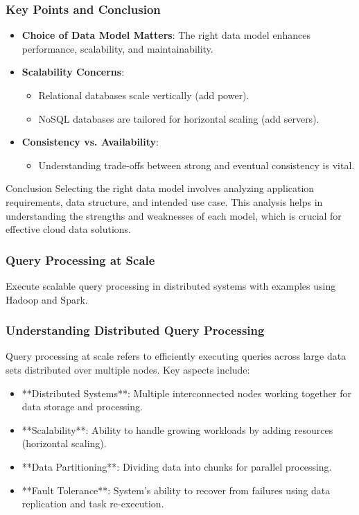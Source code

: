 \documentclass[aspectratio=169]{beamer}
\begin{document}
\begin{frame}[fragile]
    \frametitle{Key Points and Conclusion}
    
    \begin{itemize}
        \item \textbf{Choice of Data Model Matters}: The right data model enhances performance, scalability, and maintainability.
        \item \textbf{Scalability Concerns}: 
            \begin{itemize}
                \item Relational databases scale vertically (add power).
                \item NoSQL databases are tailored for horizontal scaling (add servers).
            \end{itemize}
        \item \textbf{Consistency vs. Availability}: 
            \begin{itemize}
                \item Understanding trade-offs between strong and eventual consistency is vital.
            \end{itemize}
    \end{itemize}
    
    \begin{block}{Conclusion}
        Selecting the right data model involves analyzing application requirements, data structure, and intended use case. 
        This analysis helps in understanding the strengths and weaknesses of each model, which is crucial for effective cloud data solutions.
    \end{block}
\end{frame}

\begin{frame}[fragile]
    \frametitle{Query Processing at Scale}
    Execute scalable query processing in distributed systems with examples using Hadoop and Spark.
\end{frame}

\begin{frame}[fragile]
    \frametitle{Understanding Distributed Query Processing}
    Query processing at scale refers to efficiently executing queries across large data sets distributed over multiple nodes. Key aspects include:
    \begin{itemize}
        \item **Distributed Systems**: Multiple interconnected nodes working together for data storage and processing.
        \item **Scalability**: Ability to handle growing workloads by adding resources (horizontal scaling).
        \item **Data Partitioning**: Dividing data into chunks for parallel processing.
        \item **Fault Tolerance**: System's ability to recover from failures using data replication and task re-execution.
    \end{itemize}
\end{frame}
\end{document}
